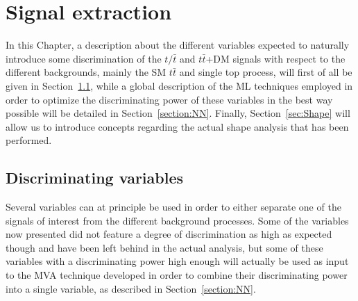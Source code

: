 \documentclass[a4paper, 10pt, openright]{report}
\begin{document}


























\chapter{Signal extraction} \label{section:Discrimination}

In this Chapter, a description about the different variables expected to naturally introduce some discrimination of the $t/\bar t$ and $t \bar t$+DM signals with respect to the different backgrounds, mainly the \ac{SM} $t \bar t$ and single top process, will first of all be given in Section~\ref{section:Variables}, while a global description of the \ac{ML} techniques employed in order to optimize the discriminating power of these variables in the best way possible will be detailed in Section~\ref{section:NN}. Finally, Section~\ref{sec:Shape} will allow us to introduce concepts regarding the actual shape analysis that has been performed.

\section{Discriminating variables} \label{section:Variables}

Several variables can at principle be used in order to either separate one of the signals of interest from the different background processes. Some of the variables now presented did not feature a degree of discrimination as high as expected though and have been left behind in the actual analysis, but some of these variables with a discriminating power high enough will actually be used as input to the \ac{MVA} technique developed in order to combine their discriminating power into a single variable, as described in Section~\ref{section:NN}.
\end{document}

